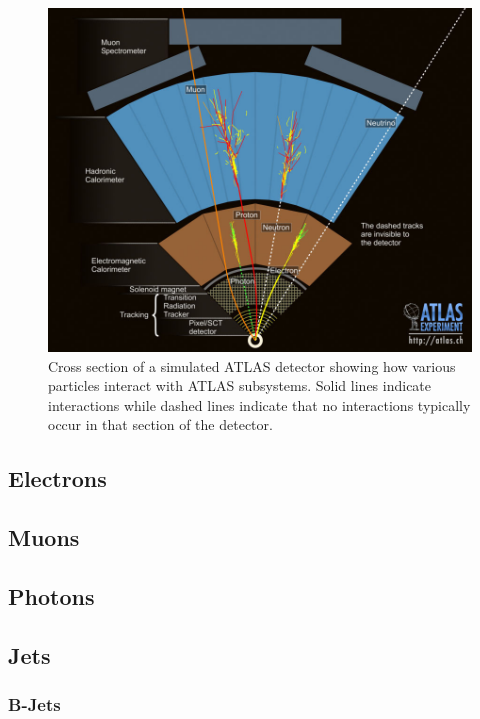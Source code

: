 \begin{figure}[h!]
	\centering
	\includegraphics[width=\columnwidth]{../ThesisImages/Simulation/ParticleInteractions.jpg}
	\caption[Cross section of a simulated ATLAS detector showing how various particles interact with ATLAS subsystems.]{Cross section of a simulated ATLAS detector showing how various particles interact with ATLAS subsystems.  Solid lines indicate interactions while dashed lines indicate that no interactions typically occur in that section of the detector. \cite{ParticleInteractions} 
	}
	\label{fig:ATLASInteractions}
\end{figure}


\subsection{Electrons}
\subsection{Muons}
\subsection{Photons}
\subsection{Jets}
\subsubsection{B-Jets}
\label{sec:bjetReco}


